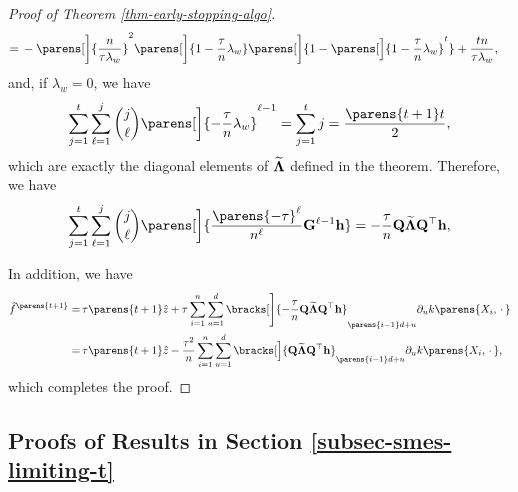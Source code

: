 \begin{proof}[Proof of Theorem \ref{thm-early-stopping-algo}]
\begin{align*}
		= & \, - \parens[\bigg]{\frac{n}{\tau \lambda_w}}^{2} \parens[\bigg]{1 - \frac{\tau}{n} \lambda_{w}} \parens[\bigg]{1 - \parens[\Big]{1 - \frac{\tau}{n} \lambda_{w}}^t} + \frac{tn}{\tau \lambda_w}, %
	\end{align*}
	and, if $\lambda_w = 0$, we have 
	\begin{align*}
		\sum_{j=1}^t \sum_{\ell=1}^j {j \choose \ell} \parens[\bigg]{- \frac{\tau}{n} \lambda_{w}}^{\ell-1} = \sum_{j=1}^t j = \frac{\parens{t+1} t}{2}, %
	\end{align*}
	which are exactly the diagonal elements of $\widetilde{\boldsymbol{\Lambda}}$ defined in the theorem. Therefore, we have 
	\begin{align*}
		\sum_{j=1}^t \sum_{\ell=1}^j {j \choose \ell} \parens[\bigg]{\frac{\parens{-\tau}^{\ell}}{n^{\ell}} \bG^{\ell-1} \bh} = - \frac{\tau}{n} \bQ \widetilde{\bLambda} \bQ^\top \bh, 
	\end{align*}
	
	In addition, we have 
	\begin{align*}
		\hat{f}^{\parens{t+1}} = & \, \tau \parens{t + 1} \hat{z} + \tau \sum_{i=1}^n \sum_{u=1}^d \bracks[\Bigg]{- \frac{\tau}{n} \bQ \widetilde{\bLambda} \bQ^\top \bh}_{\parens{i-1}d+u} \partial_u k \parens{X_i, \,\cdot\,} \\ 
		= & \, \tau \parens{t + 1} \hat{z} - \frac{\tau^2}{n} \sum_{i=1}^n \sum_{u=1}^d \bracks[\Big]{\bQ \widetilde{\bLambda} \bQ^\top \bh}_{\parens{i-1}d+u} \partial_u k \parens{X_i, \,\cdot\,}, 
	\end{align*}
	which completes the proof. 
\end{proof}


\subsection{Proofs of Results in Section \ref{subsec-smes-limiting-t}}\label{subsection-proof-smes-limiting-t}

